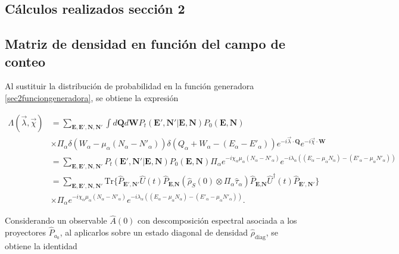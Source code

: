 \begin{appendixs}
	
	\section{Cálculos realizados sección 2}

    \subsection{Matriz de densidad en función del campo de conteo}

    \label{apendix:fcs1}
    Al sustituir la distribución de probabilidad en la función generadora \ref{sec2funciongeneradora}, se obtiene la expresión 

    \begin{align*}
        \Lambda(\vec{\lambda},\vec{\chi}) & = \sum_{\textbf{E},\textbf{E}',\textbf{N},\textbf{N}'} \int d\textbf{Q}d\textbf{W} P_{t}(\textbf{E}',\textbf{N}'|\textbf{E},\textbf{N}) P_{0}(\textbf{E},\textbf{N})  \\
        & \times \Pi_{\alpha} \delta(W_{\alpha} - \mu_{\alpha}(N_{\alpha} - N'_{\alpha}) ) \delta(Q_{\alpha} + W_{\alpha} -(E_{\alpha} - E'_{\alpha})) e^{-i\vec{\lambda}\cdot \textbf{Q}} e^{-i\vec{\chi}\cdot \textbf{W}} \\
        & = \sum_{\textbf{E},\textbf{E}',\textbf{N},\textbf{N}'}P_{t}(\textbf{E}',\textbf{N}'|\textbf{E},\textbf{N})P_{0}(\textbf{E},\textbf{N}) \Pi_{\alpha}e^{-i\chi_{\alpha}\mu_{\alpha}(N_{\alpha} - N'_{\alpha})}e^{-i\lambda_{\alpha}((E_{\alpha} -\mu_{\alpha}N_{\alpha}) - (E'_{\alpha} - \mu_{\alpha}N'_{\alpha}) ) }  \\
        & = \sum_{\textbf{E},\textbf{E}',\textbf{N},\textbf{N}'} \text{Tr}\{\hat{P}_{\textbf{E}',\textbf{N}'}\hat{U}(t)\hat{P}_{\textbf{E},\textbf{N}}(\hat{\rho}_{S}(0) \otimes \Pi_{\alpha}\hat{\tau}_{\alpha} )\hat{P}_{\textbf{E},\textbf{N}}\hat{U}^{\dagger}(t)\hat{P}_{\textbf{E}',\textbf{N}'}   \} \\
        & \times \Pi_{\alpha} e^{-i\chi_{\alpha}\mu_{\alpha}(N_{\alpha} - N'_{\alpha})}e^{-i\lambda_{\alpha}((E_{\alpha} -\mu_{\alpha}N_{\alpha}) - (E'_{\alpha} - \mu_{\alpha}N'_{\alpha}) ) }.
    \end{align*}

Considerando un observable $\hat{A}(0)$ con descomposición espectral asociada a los proyectores $\hat{P}_{a_0}$, al aplicarlos sobre un estado diagonal de densidad $\hat{\rho}_{\text{diag}}$, se obtiene la identidad\cite{esposito2009nonequilibrium}


\end{appendixs}
